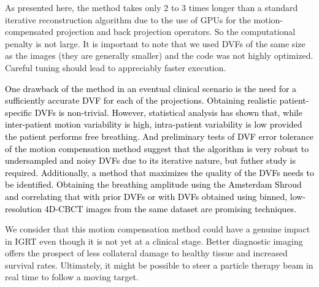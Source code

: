 As presented here, the method takes only 2 to 3 times longer than a standard iterative reconstruction algorithm due to the use of GPUs for the motion-compensated projection and back projection operators.  So the computational penalty is not large.  It is important to note that we used DVFs of the same size as the images (they are generally smaller) and the code was not highly optimized.  Careful tuning should lead to appreciably faster execution.

\textcolor{black}{One drawback of the method in an eventual clinical scenario is the need for a sufficiently accurate DVF for each of the projections. Obtaining realistic patient-specific DVFs is non-trivial.  However, statistical analysis\cite{Sonke2008590}\cite{0031-9155-51-17-003} has shown that, while inter-patient motion variability is high, intra-patient variability is low provided the patient performs free breathing.  And preliminary tests of DVF error tolerance of the motion compensation method suggest that the algorithm is very robust to undersampled and noisy DVFs due to its iterative nature, but futher study is required.  Additionally, a method that maximizes the quality of the DVFs needs to be identified. Obtaining the breathing amplitude using the Amsterdam Shroud\cite{0031-9155-58-5-1447} and correlating that with prior DVFs or with DVFs obtained using binned, low-resolution 4D-CBCT images from the same dataset are promising techniques.}

We consider that this motion compensation method could have a genuine impact in IGRT even though it is not yet at a clinical stage.  Better diagnostic imaging offers the prospect of less collateral damage to healthy tissue and increased survival rates.  Ultimately, it might be possible to steer a particle therapy beam in real time to follow a moving target. 



	




